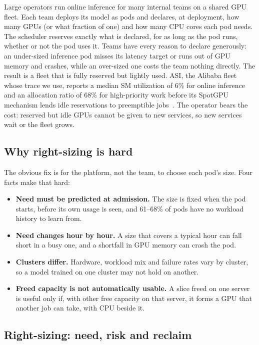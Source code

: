 \documentclass[10pt]{article}
\begin{document}
Large operators run online inference for many internal teams on a shared GPU fleet. Each team deploys its model as pods and declares, at deployment, how many GPUs (or what fraction of one) and how many CPU cores each pod needs. The scheduler reserves exactly what is declared, for as long as the pod runs, whether or not the pod uses it. Teams have every reason to declare generously: an under-sized inference pod misses its latency target or runs out of GPU memory and crashes, while an over-sized one costs the team nothing directly. The result is a fleet that is fully reserved but lightly used. ASI, the Alibaba fleet whose trace we use, reports a median SM utilization of 6\% for online inference and an allocation ratio of 68\% for high-priority work before its SpotGPU mechanism lends idle reservations to preemptible jobs~\citep{li2026asi}. The operator bears the cost: reserved but idle GPUs cannot be given to new services, so new services wait or the fleet grows.

\subsection{Why right-sizing is hard}
\label{sec:bg-hard}

The obvious fix is for the platform, not the team, to choose each pod's size. Four facts make that hard:
\begin{itemize}
  \item \textbf{Need must be predicted at admission.} The size is fixed when the pod starts, before its own usage is seen, and 61--68\% of pods have no workload history to learn from.
  \item \textbf{Need changes hour by hour.} A size that covers a typical hour can fall short in a busy one, and a shortfall in GPU memory can crash the pod.
  \item \textbf{Clusters differ.} Hardware, workload mix and failure rates vary by cluster, so a model trained on one cluster may not hold on another.
  \item \textbf{Freed capacity is not automatically usable.} A slice freed on one server is useful only if, with other free capacity on that server, it forms a GPU that another job can take, with CPU beside it.
\end{itemize}

\subsection{Right-sizing: need, risk and reclaim}
\label{sec:setting}
\end{document}
